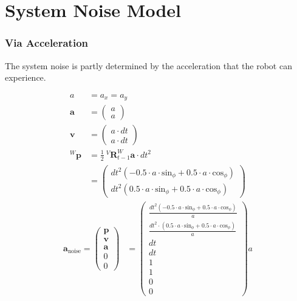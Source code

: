 \documentclass{article}
\newcommand{\Rotation}[3]{^{#1}\textbf{R}^{#2}_{#3}}
\newcommand{\Position}[2]{^{#1}\textbf{p}_{#2}}
\begin{document}
\section{System Noise Model}
\subsubsection{Via Acceleration}

The system noise is partly determined by the acceleration that the robot can experience.

\begin{align}
  a &= a_x = a_y \\
  \textbf{a} &= \left(\begin{matrix}a\\a\end{matrix}\right) \\
  \textbf{v} &= \left(\begin{matrix}a \cdot dt\\a \cdot dt\end{matrix}\right) \\
  \Position{W}{} &= \frac{1}{2}\ \Rotation{V}{W}{t-1}\textbf{a} \cdot dt^2 \\ 
  &= \left(\begin{matrix}dt^{2} \left(- 0.5 \cdot a \cdot \textrm{sin}_\phi + 0.5 \cdot a \cdot \textrm{cos}_\phi\right)\\dt^{2} \left(0.5 \cdot a \cdot \textrm{sin}_\phi + 0.5 \cdot a \cdot \textrm{cos}_\phi\right)\end{matrix}\right)
\end{align}
\begin{align}
  \textbf{a}_{\textrm{noise}} =
  \left(\begin{matrix}
    \textbf{p} \\
    \textbf{v} \\
    \textbf{a} \\
    0 \\
    0
  \end{matrix}\right)
&= \left(\begin{matrix}\frac{dt^{2} \left(- 0.5 \cdot a \cdot \textrm{sin}_\phi + 0.5 \cdot a \cdot \textrm{cos}_\phi\right)}{a}\\\frac{dt^{2} \cdot \left(0.5 \cdot a \cdot \textrm{sin}_\phi + 0.5 \cdot a \cdot \textrm{cos}_\phi\right)}{a}\\dt\\dt\\1\\1\\0\\0\end{matrix}\right) a
\end{align}
\end{document}
